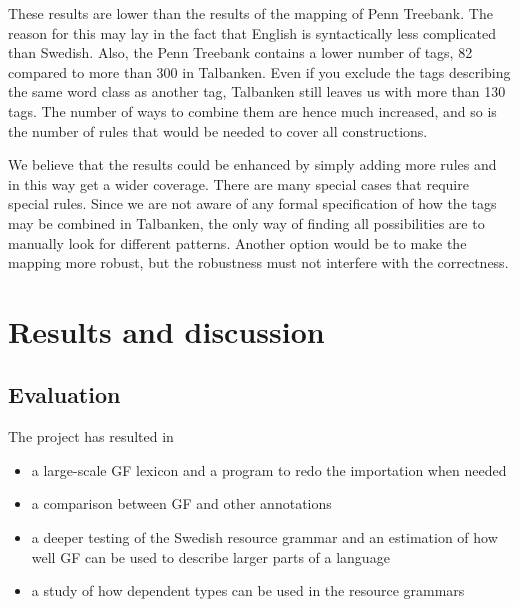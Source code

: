 \documentclass{report}
\begin{document}
These results are lower than the results of the mapping of Penn Treebank. The
reason for this may lay in the fact that English is syntactically less complicated
than Swedish. Also, the Penn Treebank contains a lower number of tags, 82 compared
to more than 300 in Talbanken. Even if you exclude the tags describing the same word
class as another tag, Talbanken still leaves us with more than 130 tags. The 
number of ways to combine them are hence much increased, and so is the number of
rules that would be needed to cover all constructions.

We believe that the results could be enhanced by simply adding more rules 
and in this way get a wider coverage. There are many special cases that require
special rules. Since we are not aware of any formal specification of how the tags may be
combined in Talbanken, the only way of finding all possibilities are to manually look
for different patterns. Another option would be to make the mapping more
robust, but the robustness must not interfere with the correctness.





\chapter{Results and discussion}
\label{sec:results}
\section{Evaluation}
The project has resulted in
\begin{itemize}
\item a large-scale GF lexicon and a program to redo the importation when needed
\item a comparison between GF and other annotations
\item a deeper testing of the Swedish resource grammar and an estimation
of how well GF can be used to describe larger parts of a language
\item a study of how dependent types can be used in the resource grammars
\end{itemize}
\end{document}
